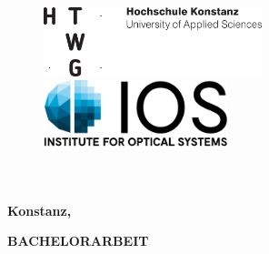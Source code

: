 \begin{titlepage}

\vspace*{-2.5cm}

\begin{figure}[h]
\hspace*{-2cm}
\includegraphics[height=2cm]{title/HTWG-Logo_en_300dpi.png}
\hspace*{4cm}\includegraphics[height=2cm,]{title/IOS_Logo2016_lettering_en.png}


\end{figure}

\vspace{2cm}

\begin{center}
	 \LARGE{
		\textbf{\thema} \\[5cm]
	}
	\Large{
		\textbf{\autor}} \\[5.5cm]
	\large{
		\textbf{Konstanz, \abgabedatum} \\[2.3cm]
	}
	
	\Huge{
		\textbf{{\sf BACHELORARBEIT}}
	}
\end{center}

\end{titlepage}
